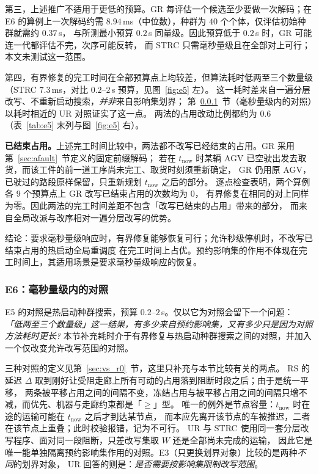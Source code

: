 \documentclass[manuscript,screen,review]{acmart}
\providecommand{\STRC}{\textsc{STRC}}
\newcommand{\MsRepairMed}{7.3}
\newcommand{\RzeroPastLo}{0}
\newcommand{\MsRedecode}{8.94}       %
\begin{document}
第三，上述推广不适用于更低的预算。GR 每评估一个候选至少要做一次解码；在 E6 的算例上一次解码约需
\(\MsRedecode\)\,ms（中位数），种群为 \(40\) 个个体，仅评估初始种群就需约 \(0.37\)\,s，
与所测最小预算 \(0.2\)\,s 同量级。因此预算低于 \(0.2\)\,s 时，GR 可能连一代都评估不完，次序可能反转，
而 \STRC{} 只需毫秒量级且在全部对上可行；本文未测试这一范围。

第四，有界修复的完工时间在全部预算点上均较差，但算法耗时低两至三个数量级
（\STRC{} \(\MsRepairMed\)\,ms，对比 \(0.2\)--\(2\)\,s 预算，见图~\ref{fig:e5} 左）。
这一耗时差来自一遍分层改写、不重新启动搜索，\emph{并非}来自影响集划界；
第~\ref{sec:cheap}~节（毫秒量级内的对照）以耗时相近的 UR 对照证实了这一点。
两法的占用改动比例都约为 \(0.6\)（表~\ref{tab:e5} 末列与图~\ref{fig:e5} 右）。

\textbf{已结束占用。}上述完工时间比较中，两法都不改写已经结束的占用。GR 采用第~\ref{sec:afault}~节定义的固定前缀解码；
若在 \(t_{\mathrm{now}}\) 时某辆 AGV 已空驶出发去取货，而该工件的前一道工序尚未完工、取货时刻须重新确定，
GR 仍用原 AGV，已驶过的路段原样保留，只重新规划 \(t_{\mathrm{now}}\) 之后的部分。
逐点检查表明，两个算例各 \(9\) 个预算点上 GR 改写已结束占用的次数均为 \(\RzeroPastLo\)，
有界修复在相同的对上同样为零。因此两法的完工时间差距不包含「改写已结束的占用」带来的部分，
而来自全局改派与改序相对一遍分层改写的优势。

结论：要求毫秒量级响应时，有界修复能够恢复可行；允许秒级停机时，不改写已结束占用的热启动全局重调度
在完工时间上占优。预约影响集的作用不体现在完工时间上，其适用场景是要求毫秒量级响应的恢复。

\subsubsection{E6：毫秒量级内的对照}
\label{sec:cheap}

E5 的对照是热启动种群搜索，预算 \(0.2\)--\(2\)\,s。仅以它为对照会留下一个问题：
\emph{「低两至三个数量级」这一结果，有多少来自预约影响集，又有多少只是因为对照方法耗时更长?}
本节补充耗时介于有界修复与热启动种群搜索之间的对照，并加入一个仅改变允许改写范围的对照。

三种对照的定义见第~\ref{sec:vs_r0}~节，这里只补充与本节比较有关的两点。
RS 的延迟 \(\Delta\) 取到刚好让受阻走廊上所有可动的占用落到阻断时段之后；由于是统一平移，
两条被平移占用之间的间隔不变，冻结占用与被平移占用之间的间隔只增不减，而优先、机器与走廊约束都是「\(\ge\)」型。
唯一的例外是节点容量：\(t_{\mathrm{now}}\) 时在途的运输可能在 \(t_{\mathrm{now}}\) 之后才到达某节点，
而本应先离开该节点的车被推迟，二者在该节点上重叠；此时校验报错，记为不可行。
UR 与 \STRC{} 使用同一套分层改写程序、面对同一段阻断，只差改写集取 \(W\) 还是全部尚未完成的运输，
因此它是唯一能单独隔离预约影响集作用的对照。E3（只更换划界对象）比较的是两种\emph{不同}的划界对象，
UR 回答的则是：\emph{是否需要按影响集限制改写范围}。
\end{document}
